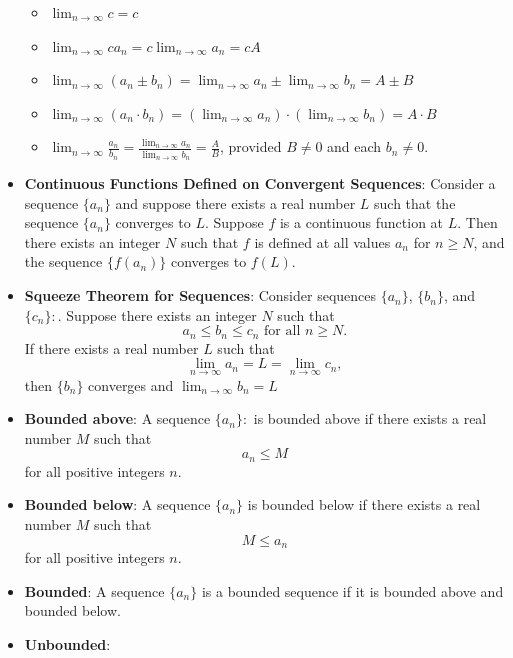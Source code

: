 \documentclass{report}
\begin{document}
\begin{itemize}
        \begin{itemize}
            \item \( \lim_{{n \to \infty}} c = c \)
            \item \( \lim_{{n \to \infty}} c a_n = c \lim_{{n \to \infty}} a_n = cA \)
            \item \( \lim_{{n \to \infty}} (a_n \pm b_n) = \lim_{{n \to \infty}} a_n \pm \lim_{{n \to \infty}} b_n = A \pm B \)
            \item \( \lim_{{n \to \infty}} (a_n \cdot b_n) = (\lim_{{n \to \infty}} a_n) \cdot (\lim_{{n \to \infty}} b_n) = A \cdot B \)
            \item \( \lim_{{n \to \infty}} \frac{a_n}{b_n} = \frac{\lim_{{n \to \infty}} a_n}{\lim_{{n \to \infty}} b_n} = \frac{A}{B} \), provided \( B \neq 0 \) and each \( b_n \neq 0 \).
        \end{itemize}
    \item \textbf{Continuous Functions Defined on Convergent Sequences}:
        Consider a sequence \( \{a_n\} \) and suppose there exists a real number \( L \) such that the sequence \( \{a_n\} \) converges to \( L \). Suppose \( f \) is a continuous function at \( L \). Then there exists an integer \( N \) such that \( f \) is defined at all values \( a_n \) for \( n \geq N \), and the sequence \( \{f(a_n)\} \) converges to \( f(L) \).
    \item \textbf{Squeeze Theorem for Sequences}:           Consider sequences \( \{a_n\} \), \( \{b_n\} \), and \( \{c_n\}: \). Suppose there exists an integer \( N \) such that
        \[ a_n \leq b_n \leq c_n \text{ for all } n \geq N. \]
        If there exists a real number \( L \) such that
        \[ \lim_{{n \to \infty}} a_n = L = \lim_{{n \to \infty}} c_n, \]
        then \( \{b_n\} \) converges and \( \lim_{{n \to \infty}} b_n = L \)
    \item \textbf{Bounded above}:           A sequence \( \{a_n\}: \) is bounded above if there exists a real number \( M \) such that
        \[ a_n \leq M \]
        for all positive integers \( n \).
    \item \textbf{Bounded below}:
        A sequence \( \{a_n\} \) is bounded below if there exists a real number \( M \) such that
        \[ M \leq a_n \]
        for all positive integers \( n \).
    \item \textbf{Bounded}:
        A sequence \( \{a_n\} \) is a bounded sequence if it is bounded above and bounded below. 
    \item \textbf{Unbounded}:

\end{itemize}
\end{document}
